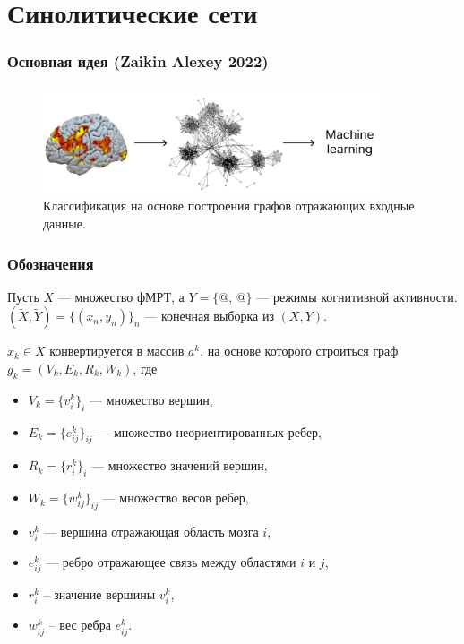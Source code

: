 \documentclass{beamer}
\makeatletter
\newcommand*{\rom}[1]{\expandafter\@slowromancap\romannumeral #1@}
\makeatother
\begin{document}
	\section{Синолитические сети}
	\begin{frame} 
		\frametitle{Основная идея (Zaikin Alexey 2022)}
		\begin{figure}
			\includegraphics[width=10cm]{../images/fmri_graph_ml_1.pdf}
			\caption{Классификация на основе построения графов отражающих входные данные.} 
			\label{fg:3}
		\end{figure}
	\end{frame}

	\begin{frame} 
		\frametitle{Обозначения}
		Пусть $X$ --- множество фМРТ, а $Y = \{$\rom{1}, \rom{2}$\}$ --- режимы когнитивной активности. $(\widetilde{X}, \widetilde{Y}) =  \{(x_{n}, y_{n})\}_n$ --- конечная выборка из $(X, Y)$.
		\vspace{0.5cm}
		
		$x_k \in X$ конвертируется в массив $a^k$, на основе которого строиться граф $g_k = (V_k, E_k, R_k, W_k)$, где 
		\begin{itemize}
			\item $V_k = \{v_i^k\}_i$ --- множество вершин,
			\item $E_k = \{e_{ij}^k\}_{ij}$ --- множество неориентированных ребер,
			\item $R_k = \{r_i^k\}_i$ --- множество значений вершин,
			\item $W_k = \{w_{ij}^k\}_{ij}$ --- множество весов ребер,
			\item $v_i^k$ --- вершина отражающая область мозга $i$,
			\item $e_{ij}^k$ --- ребро отражающее связь между областями $i$ и $j$,
			\item $r_i^k$ -- значение вершины $v_i^k$,
			\item $w_{ij}^k$ -- вес ребра $e_{ij}^k$.
		\end{itemize}									
	\end{frame}
\end{document}
